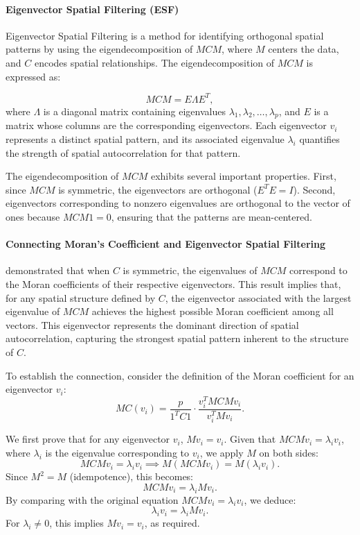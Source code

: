 \documentclass[12pt]{article}
\begin{document}
\paragraph{Eigenvector Spatial Filtering (ESF)}

Eigenvector Spatial Filtering is a method for identifying orthogonal spatial patterns by using the eigendecomposition of \( MCM \), where \( M \) centers the data, and \( C \) encodes spatial relationships. The eigendecomposition of \( MCM \) is expressed as:

\[
  MCM = E \Lambda E^T,
\]
where \( \Lambda \) is a diagonal matrix containing eigenvalues \( \lambda_1, \lambda_2, \ldots, \lambda_p \), and \( E \) is a matrix whose columns are the corresponding eigenvectors. Each eigenvector \( v_i \) represents a distinct spatial pattern, and its associated eigenvalue \( \lambda_i \) quantifies the strength of spatial autocorrelation for that pattern.

The eigendecomposition of \( M C M \) exhibits several important properties. First, since \( MCM \) is symmetric, the eigenvectors are orthogonal (\( E^T E = I \)). Second, eigenvectors corresponding to nonzero eigenvalues are orthogonal to the vector of ones because \( MCM 1 = 0 \), ensuring that the patterns are mean-centered.


\paragraph{Connecting Moran's Coefficient and Eigenvector Spatial Filtering}

\citet{de1984extreme} demonstrated that when \( C \) is symmetric, the eigenvalues of \( MCM \) correspond to the Moran coefficients of their respective eigenvectors. This result implies that, for any spatial structure defined by \( C \), the eigenvector associated with the largest eigenvalue of \( MCM \) achieves the highest possible Moran coefficient among all vectors. This eigenvector represents the dominant direction of spatial autocorrelation, capturing the strongest spatial pattern inherent to the structure of \( C \).

To establish the connection, consider the definition of the Moran coefficient for an eigenvector \( v_i \):
\[
  MC(v_i) = \frac{p}{1^T C 1} \cdot \frac{v_i^T MCM v_i}{v_i^T M v_i}.
\]

We first prove that for any eigenvector \( v_i \), \( M v_i = v_i \). Given that \( MCM v_i = \lambda_i v_i \), where \( \lambda_i \) is the eigenvalue corresponding to \( v_i \), we apply \( M \) on both sides:
\[
  MCM v_i = \lambda_i v_i \implies M(MCM v_i) = M(\lambda_i v_i).
\]
Since \( M^2 = M \) (idempotence), this becomes:
\[
  MCM v_i = \lambda_i M v_i.
\]
By comparing with the original equation \( MCM v_i = \lambda_i v_i \), we deduce:
\[
  \lambda_i v_i = \lambda_i M v_i.
\]
For \( \lambda_i \neq 0 \), this implies \( M v_i = v_i \), as required.
\end{document}
